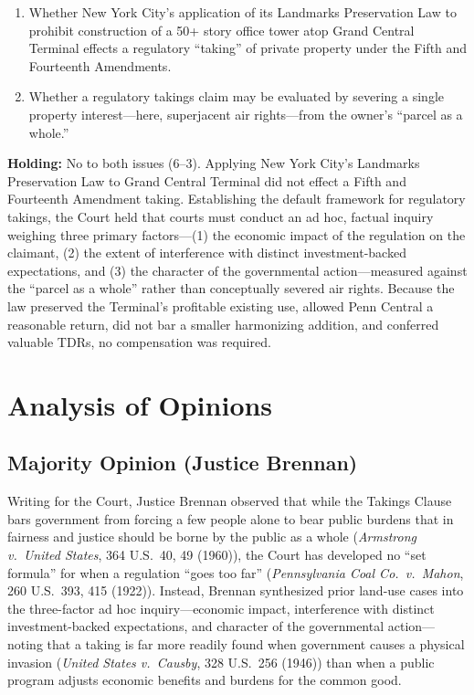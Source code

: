\documentclass[12pt]{article}
\begin{document}
\begin{enumerate}
  \item Whether New York City's application of its Landmarks Preservation Law to prohibit construction of a 50+ story office tower atop Grand Central Terminal effects a regulatory ``taking'' of private property under the Fifth and Fourteenth Amendments.
  \item Whether a regulatory takings claim may be evaluated by severing a single property interest---here, superjacent air rights---from the owner's ``parcel as a whole.''
\end{enumerate}

\textbf{Holding:} No to both issues (6--3). Applying New York City's Landmarks Preservation Law to Grand Central Terminal did not effect a Fifth and Fourteenth Amendment taking. Establishing the default framework for regulatory takings, the Court held that courts must conduct an ad hoc, factual inquiry weighing three primary factors---(1) the economic impact of the regulation on the claimant, (2) the extent of interference with distinct investment-backed expectations, and (3) the character of the governmental action---measured against the ``parcel as a whole'' rather than conceptually severed air rights. Because the law preserved the Terminal's profitable existing use, allowed Penn Central a reasonable return, did not bar a smaller harmonizing addition, and conferred valuable TDRs, no compensation was required.

\section{Analysis of Opinions}
\subsection{Majority Opinion (Justice Brennan)}

Writing for the Court, Justice Brennan observed that while the Takings Clause bars government from forcing a few people alone to bear public burdens that in fairness and justice should be borne by the public as a whole (\textit{Armstrong v.\ United States}, 364 U.S.\ 40, 49 (1960)), the Court has developed no ``set formula'' for when a regulation ``goes too far'' (\textit{Pennsylvania Coal Co.\ v.\ Mahon}, 260 U.S.\ 393, 415 (1922)). Instead, Brennan synthesized prior land-use cases into the three-factor ad hoc inquiry---economic impact, interference with distinct investment-backed expectations, and character of the governmental action---noting that a taking is far more readily found when government causes a physical invasion (\textit{United States v.\ Causby}, 328 U.S.\ 256 (1946)) than when a public program adjusts economic benefits and burdens for the common good.
\end{document}
